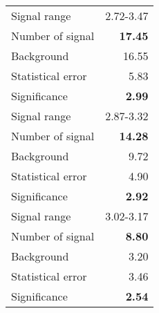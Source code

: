  {\large{
 \begin{tabular}{||l r||}
 \hline
 \hline
Signal range &      2.72-3.47 \\
Number of signal &  \textbf{  17.45} \\
Background &          16.55 \\
Statistical error &    5.83 \\
Significance &      \textbf{   2.99} \\
 \hline
Signal range &      2.87-3.32 \\
Number of signal &  \textbf{  14.28} \\
Background &           9.72 \\
Statistical error &    4.90 \\
Significance &      \textbf{   2.92} \\
 \hline
Signal range &      3.02-3.17 \\
Number of signal &  \textbf{   8.80} \\
Background &           3.20 \\
Statistical error &    3.46 \\
Significance &      \textbf{   2.54} \\
 \hline
 \hline
 \end{tabular}
 }}
 \endinput
